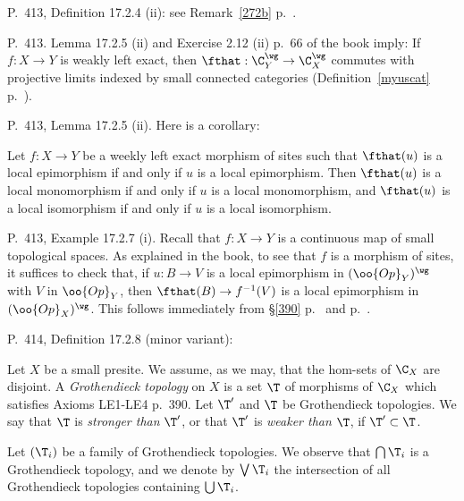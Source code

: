 \documentclass[12pt]{article}
\theoremstyle{remark}
\theoremstyle{definition}
\begin{document}
\begin{s}
P.~413, Definition 17.2.4 (ii): see  Remark~\ref{272b} p.~.
\end{s}

%

\begin{s}
P.~413. Lemma 17.2.5 (ii) and Exercise 2.12 (ii) p.~66 of the book imply: If $f:X\to Y$ is weakly left exact, then $\fthat:\C_Y^\wg\to\C_X^\wg$ commutes with projective limits indexed by small connected categories (Definition~\ref{myuscat} p.~).
\end{s} 

%

\begin{s} 
P.~413, Lemma 17.2.5 (ii). Here is a corollary: 

Let $f:X\to Y$ be a weekly left exact morphism of sites such that $\fthat(u)$ is a local epimorphism if and only if $u$ is a local epimorphism. Then $\fthat(u)$ is a local monomorphism if and only if $u$ is a local monomorphism, and $\fthat(u)$ is a local isomorphism if and only if $u$ is a local isomorphism. 
\end{s} 

%

\begin{s}
P.~413, Example 17.2.7 (i). Recall that $f:X\to Y$ is a continuous map of small topological spaces. As explained in the book, to see that $f$ is a morphism of sites, it suffices to check that, if $u:B\to V$ is a local epimorphism in $(\oo{Op}_Y)^\wg$ with $V$ in $\oo{Op}_Y$, then $\fthat(B)\to f^{-1}(V)$ is a local epimorphism in $(\oo{Op}_X)^\wg$. This follows immediately from \S\ref{390} p.~ and  p.~. 
\end{s}

%

\begin{s} 
P.~414, Definition 17.2.8 (minor variant):

\begin{df} 
Let $X$ be a small presite. We assume, as we may, that the hom-sets of $\C_X$ are disjoint. A {\em Grothendieck topology} on $X$ is a set $\T$ of morphisms of $\C_X$ which satisfies Axioms LE1-LE4 p.~390. Let $\T'$ and $\T$ be Grothendieck topologies. We say that $\T$ is {\em stronger than} $\T'$, or that $\T'$ is {\em weaker than} $\T$, if $\T'\subset\T$. 
\end{df}

Let $(\T_i)$ be a family of Grothendieck topologies. We observe that $\bigcap\T_i$ is a Grothendieck topology, and we denote by $\bigvee\T_i$ the intersection of all Grothendieck topologies containing $\bigcup\T_i$.
\end{s}
\end{document}
